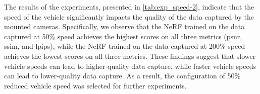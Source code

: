 \begin{comment}
\vspace{0.5cm}

\setlength{\tabcolsep}{12pt}
\renewcommand{\arraystretch}{1.2}
\begin{tabular}{l l}
\multicolumn{2}{c}{\textbf{Experiment setup - constant variables}} \\
\hline
Parameter & Value \\
\hline
\cellcolor{blue}Camera setup &\cellcolor{blue}Two cameras, $[-10^{\circ}, 10^{\circ}]$ yaw  \\
\cellcolor{blue}Distance &\cellcolor{blue}4 turns \\
\cellcolor{blue}Ticks per image &\cellcolor{blue}Capture data every 2$^{\text{nd}}$ tick \\
\cellcolor{blue}Image resolution &\cellcolor{blue}Image resolution of $400 \times 300$ \\
\hline
\end{tabular}
\caption[Constant parameters for experiment 1.5.]{Overview of the values of the parameters that remained constant across the experiments' runs.}
\label{tab:exp-speed-stable-variables}
\end{comment}

The results of the experiments, presented in \autoref{tab:exp_speed-2}, indicate that the speed of the vehicle significantly impacts the quality of the data captured by the mounted cameras. Specifically, we observe that the NeRF trained on the data captured at 50\% speed achieves the highest scores on all three metrics (\acrshort{psnr}, \acrshort{ssim}, and \acrshort{lpips}), while the NeRF trained on the data captured at 200\% speed achieves the lowest scores on all three metrics. These findings suggest that slower vehicle speeds can lead to higher-quality data capture, while faster vehicle speeds can lead to lower-quality data capture. As a result, the configuration of 50\% reduced vehicle speed was selected for further experiments.
















